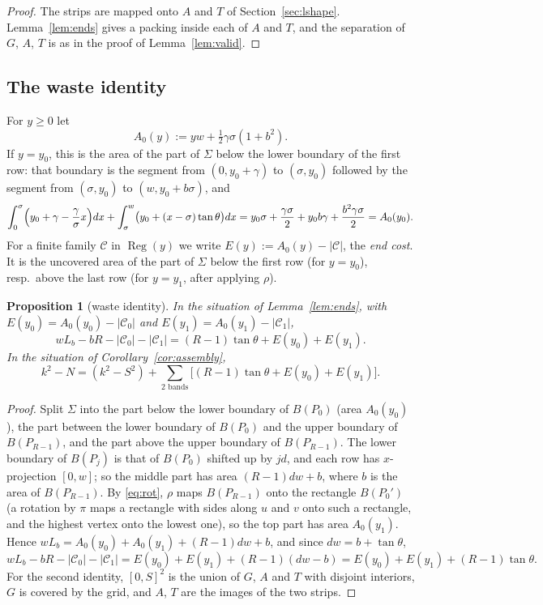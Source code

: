 \documentclass[11pt]{amsart}
\newcommand{\cC}{\mathcal C}
\newcommand{\Reg}{\operatorname{Reg}}
\newtheorem{proposition}[theorem]{Proposition}
\theoremstyle{definition}
\theoremstyle{remark}
\numberwithin{equation}{section}
\begin{document}
\begin{proof}
The strips are mapped onto $A$ and $T$ of Section~\ref{sec:lshape}. Lemma~\ref{lem:ends} gives a packing inside each of
$A$ and $T$, and the separation of $G$, $A$, $T$ is as in the proof of Lemma~\ref{lem:valid}.
\end{proof}

\subsection{The waste identity}
For $y\ge0$ let
\[
A_0(y):=yw+\tfrac12\gamma\sigma(1+b^2).
\]
If $y=y_0$, this is the area of the part of $\Sigma$ below the lower boundary of the first row: that boundary is the
segment from $(0,y_0+\gamma)$ to $(\sigma,y_0)$ followed by the segment from $(\sigma,y_0)$ to $(w,y_0+b\sigma)$, and
\[
\int_0^\sigma\Bigl(y_0+\gamma-\frac{\gamma}{\sigma}x\Bigr)dx+\int_\sigma^w\bigl(y_0+(x-\sigma)\tan\theta\bigr)dx
=y_0\sigma+\frac{\gamma\sigma}{2}+y_0b\gamma+\frac{b^2\gamma\sigma}{2}=A_0(y_0).
\]
For a finite family $\cC$ in $\Reg(y)$ we write $E(y):=A_0(y)-|\cC|$, the \emph{end cost}. It is the uncovered area of
the part of $\Sigma$ below the first row (for $y=y_0$), resp.\ above the last row (for $y=y_1$, after applying $\rho$).

\begin{proposition}[waste identity]\label{prop:waste}
In the situation of Lemma~\ref{lem:ends}, with $E(y_0)=A_0(y_0)-|\cC_0|$ and $E(y_1)=A_0(y_1)-|\cC_1|$,
\[
wL_b-bR-|\cC_0|-|\cC_1|=(R-1)\tan\theta+E(y_0)+E(y_1).
\]
In the situation of Corollary~\ref{cor:assembly},
\[
k^2-N=(k^2-S^2)+\sum_{\text{2 bands}}\bigl[(R-1)\tan\theta+E(y_0)+E(y_1)\bigr].
\]
\end{proposition}

\begin{proof}
Split $\Sigma$ into the part below the lower boundary of $B(P_0)$ (area $A_0(y_0)$), the part between the lower boundary
of $B(P_0)$ and the upper boundary of $B(P_{R-1})$, and the part above the upper boundary of $B(P_{R-1})$. The lower
boundary of $B(P_j)$ is that of $B(P_0)$ shifted up by $jd$, and each row has $x$-projection $[0,w]$; so the middle part
has area $(R-1)dw+b$, where $b$ is the area of $B(P_{R-1})$. By \eqref{eq:rot}, $\rho$ maps $B(P_{R-1})$ onto the
rectangle $B(P_0')$ (a rotation by $\pi$ maps a rectangle with sides along $u$ and $v$ onto such a rectangle, and the
highest vertex onto the lowest one), so the top part has area $A_0(y_1)$. Hence
$wL_b=A_0(y_0)+A_0(y_1)+(R-1)dw+b$, and since $dw=b+\tan\theta$,
\[
wL_b-bR-|\cC_0|-|\cC_1|=E(y_0)+E(y_1)+(R-1)(dw-b)=E(y_0)+E(y_1)+(R-1)\tan\theta .
\]
For the second identity, $[0,S]^2$ is the union of $G$, $A$ and $T$ with disjoint interiors, $G$ is covered by the grid,
and $A$, $T$ are the images of the two strips.
\end{proof}
\end{document}
